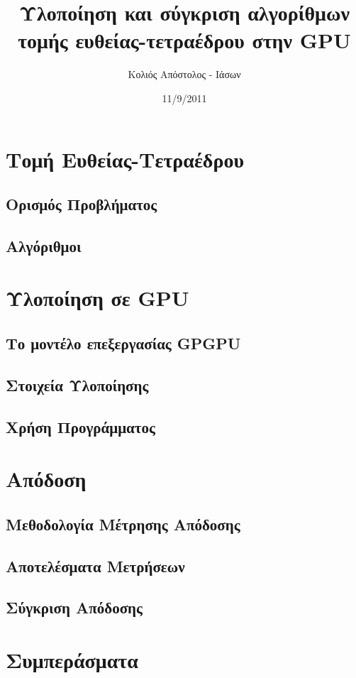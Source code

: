 \documentclass[a4paper,oneside,titlepage,12pt]{article}
\title{Υλοποίηση και σύγκριση αλγορίθμων τομής ευθείας-τετραέδρου στην GPU}
\author{Κολιός Απόστολος - Ιάσων}
\date{11/9/2011}
\begin{document}
\maketitle

\renewcommand{\contentsname}{Περιεχόμενα}
\tableofcontents



\section{Τομή Ευθείας-Τετραέδρου}
\subsection{Ορισμός Προβλήματος}
\subsection{Αλγόριθμοι}

\section{Υλοποίηση σε GPU}
\subsection{Το μοντέλο επεξεργασίας GPGPU}
\subsection{Στοιχεία Υλοποίησης}
\subsection{Χρήση Προγράμματος}

\section{Απόδοση}
\subsection{Μεθοδολογία Μέτρησης Απόδοσης}
\subsection{Αποτελέσματα Μετρήσεων}
\subsection{Σύγκριση Απόδοσης}

\section{Συμπεράσματα}
\end{document}
